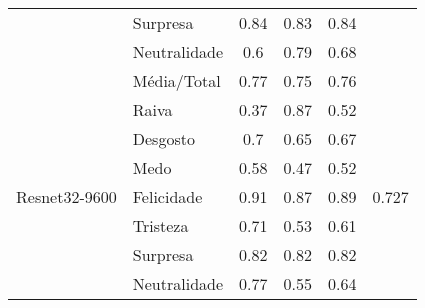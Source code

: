 \begin{table}[]
\begin{tabular}{llcccc}
                                         & Surpresa              & 0.84                                  & 0.83                                   & 0.84                                  &                                       \\
                                         & Neutralidade          & 0.6                                   & 0.79                                   & 0.68                                  &                                       \\
                                         & Média/Total           & 0.77                                  & 0.75                                   & 0.76                                  &                                       \\ \hline
\multirow{8}{*}{Resnet32-9600}           & Raiva                 & 0.37                                  & 0.87                                   & 0.52                                  & \multirow{8}{*}{0.727}                \\
                                         & Desgosto              & 0.7                                   & 0.65                                   & 0.67                                  &                                       \\
                                         & Medo                  & 0.58                                  & 0.47                                   & 0.52                                  &                                       \\
                                         & Felicidade            & 0.91                                  & 0.87                                   & 0.89                                  &                                       \\
                                         & Tristeza              & 0.71                                  & 0.53                                   & 0.61                                  &                                       \\
                                         & Surpresa              & 0.82                                  & 0.82                                   & 0.82                                  &                                       \\
                                         & Neutralidade          & 0.77                                  & 0.55                                   & 0.64                                  &                                       \\

\end{tabular}
\end{table}
